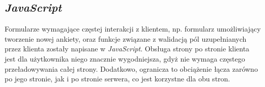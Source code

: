 \subsection{\textit{JavaScript}}
\label{Chapter63c}

Formularze wymagające częstej interakcji z klientem, np. formularz umożliwiający tworzenie nowej ankiety, oraz funkcje związane z walidacją pól uzupełnianych przez klienta zostały napisane w \textit{JavaScript}. Obsługa strony po stronie klienta jest dla użytkownika niego znacznie wygodniejsza, gdyż nie wymaga częstego przeładowywania całej strony. Dodatkowo, ogranicza to obciążenie łącza zarówno po jego stronie, jak i po stronie serwera, co jest korzystne dla obu stron.